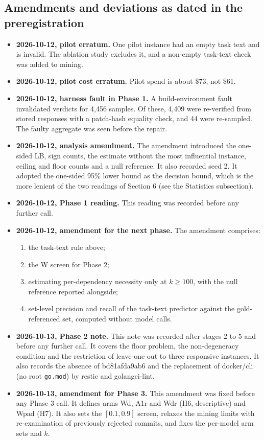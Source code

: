 \subsection{Amendments and deviations as dated in the preregistration}

\begin{itemize}
\item \textbf{2026-10-12, pilot erratum.} One pilot instance had an empty task text and is invalid. The ablation study excludes it, and a non-empty task-text check was added to mining.
\item \textbf{2026-10-12, pilot cost erratum.} Pilot spend is about \$73, not \$61.
\item \textbf{2026-10-12, harness fault in Phase 1.} A build-environment fault invalidated verdicts for 4,456 samples. Of these, 4,409 were re-verified from stored responses with a patch-hash equality check, and 44 were re-sampled. The faulty aggregate was seen before the repair.
\item \textbf{2026-10-12, analysis amendment.} The amendment introduced the one-sided LB, sign counts, the estimate without the most influential instance, ceiling and floor counts and a null reference. It also recorded seed 2. It adopted the one-sided 95\% lower bound as the decision bound, which is the more lenient of the two readings of Section 6 (see the Statistics subsection).
\item \textbf{2026-10-12, Phase 1 reading.} This reading was recorded before any further call.
\item \textbf{2026-10-12, amendment for the next phase.} The amendment comprises:
  \begin{enumerate}
  \item[(i)] the task-text rule above;
  \item[(ii)] the W screen for Phase 2;
  \item[(iii)] estimating per-dependency necessity only at $k \geq 100$, with the null reference reported alongside;
  \item[(iv)] set-level precision and recall of the task-text predictor against the gold-referenced set, computed without model calls.
  \end{enumerate}
\item \textbf{2026-10-13, Phase 2 note.} This note was recorded after stages 2 to 5 and before any further call. It covers the floor problem, the non-degeneracy condition and the restriction of leave-one-out to three responsive instances. It also records the absence of bd81afda9ab6 and the replacement of docker/cli (no root \texttt{go.mod}) by restic and golangci-lint.
\item \textbf{2026-10-13, amendment for Phase 3.} This amendment was fixed before any Phase 3 call. It defines arms Wd, A1r and Wdr (H6, descriptive) and Wpad (H7). It also sets the $[0.1, 0.9]$ screen, relaxes the mining limits with re-examination of previously rejected commits, and fixes the per-model arm sets and $k$.
\end{itemize}


